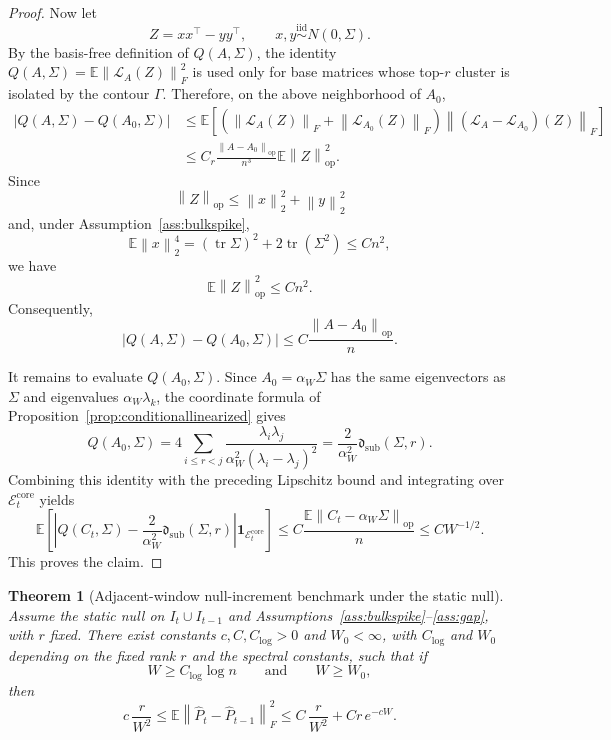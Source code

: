 \documentclass[11pt]{article}
\theoremstyle{tightplain}
\newtheorem{theorem}{Theorem}[section]
\theoremstyle{tightdef}
\DeclareMathOperator{\tr}{tr}
\DeclareMathOperator{\op}{op}
\newcommand{\E}{\mathbb E}
\newcommand{\norm}[1]{\left\lVert #1 \right\rVert}
\newcommand{\abs}[1]{\left\lvert #1 \right\rvert}
\newcommand{\one}{\mathbf 1}
\newcommand{\dsub}{\mathfrak d_{\mathrm{sub}}}
\begin{document}
\begin{proof}
Now let
\[
Z=xx^\top-yy^\top,
\qquad
x,y\stackrel{\mathrm{iid}}{\sim}N(0,\Sigma).
\]
By the basis-free definition of $Q(A,\Sigma)$, the identity
$Q(A,\Sigma)=\E\norm{\mathcal L_A(Z)}_F^2$ is used only for base matrices whose
top-$r$ cluster is isolated by the contour $\Gamma$. Therefore, on the above
neighborhood of $A_0$,
\[
\begin{aligned}
\abs{Q(A,\Sigma)-Q(A_0,\Sigma)}
&\le
\E\left[
\left(
\norm{\mathcal L_A(Z)}_F+\norm{\mathcal L_{A_0}(Z)}_F
\right)
\norm{(\mathcal L_A-\mathcal L_{A_0})(Z)}_F
\right]  \\
&\le
C_r
\frac{\norm{A-A_0}_{\op}}{n^3}
\E\norm Z_{\op}^2 .
\end{aligned}
\]
Since
\[
\norm Z_{\op}
\le
\norm{x}_2^2+\norm{y}_2^2
\]
and, under Assumption~\ref{ass:bulkspike},
\[
\E\norm{x}_2^4
=(\tr\Sigma)^2+2\tr(\Sigma^2)
\le Cn^2,
\]
we have
\[
\E\norm Z_{\op}^2\le Cn^2.
\]
Consequently,
\[
\abs{Q(A,\Sigma)-Q(A_0,\Sigma)}
\le
C\frac{\norm{A-A_0}_{\op}}n .
\]

It remains to evaluate $Q(A_0,\Sigma)$. Since $A_0=\alpha_W\Sigma$ has the same
eigenvectors as $\Sigma$ and eigenvalues $\alpha_W\lambda_k$, the coordinate
formula of Proposition~\ref{prop:conditionallinearized} gives
\[
Q(A_0,\Sigma)
=4\sum_{i\le r<j}
\frac{\lambda_i\lambda_j}
{\alpha_W^2(\lambda_i-\lambda_j)^2}
=\frac{2}{\alpha_W^2}\dsub(\Sigma,r).
\]
Combining this identity with the preceding Lipschitz bound and integrating over
$\mathcal E_t^{\mathrm{core}}$ yields
\[
\E\left[
\left|
Q(C_t,\Sigma)
-\frac{2}{\alpha_W^2}\dsub(\Sigma,r)
\right|
\one_{\mathcal E_t^{\mathrm{core}}}
\right]
\le
C\frac{\E\norm{C_t-\alpha_W\Sigma}_{\op}}n
\le
C W^{-1/2}.
\]
This proves the claim.
\end{proof}

\begin{theorem}[Adjacent-window null-increment benchmark under the static null]\label{thm:overlapbenchmark}
Assume the static null on $I_t\cup I_{t-1}$ and
Assumptions~\ref{ass:bulkspike}--\ref{ass:gap}, with $r$ fixed. There exist
constants $c,C,C_{\log}>0$ and $W_0<\infty$, with $C_{\log}$ and $W_0$
depending on the fixed rank $r$ and the spectral constants, such that if
\[
W\ge C_{\log}\log n
\qquad
\text{and}
\qquad
W\ge W_0,
\]
then
\[
c\,\frac r{W^2}
\le
\E\norm{\widehat P_t-\widehat P_{t-1}}_F^2
\le
C\,\frac r{W^2}+C r\, e^{-cW}.
\]
\end{theorem}
\end{document}
